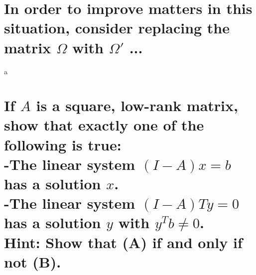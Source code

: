 \documentclass[letterpaper,10pt]{article}
\begin{document}
\section*{In order to improve matters in this situation, consider replacing the matrix $\Omega$ with $\Omega'$  ...}
a
\section*{If $A$ is a square, low-rank matrix, show that exactly one of the following is true:\\
-The linear system $(I-A)x=b$ has a solution $x$.\\
-The linear system $(I-A)Ty=0$ has a solution $y$ with $y^Tb\neq0$.\\
Hint: Show that (A) if and only if not (B).}
\end{document}
